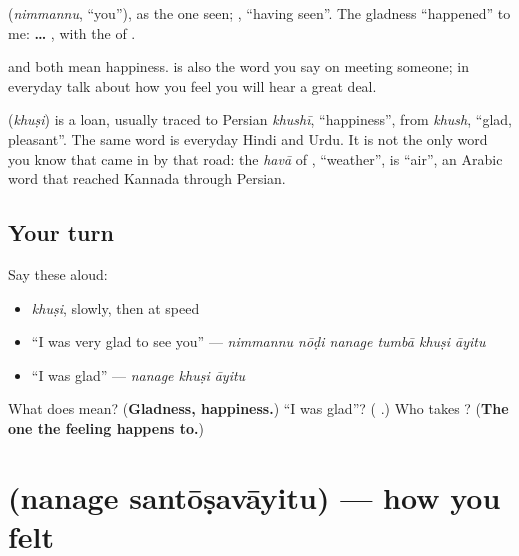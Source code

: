 \textbf{} (\emph{nimmannu}, \textquotedblleft{}you\textquotedblright{}), as the one seen; \textbf{}, \textquotedblleft{}having seen\textquotedblright{}. The gladness \textquotedblleft{}happened\textquotedblright{} to me: \textbf{ …  }, with the \textbf{} of \textbf{  }.

\textbf{} and \textbf{} both mean happiness. \textbf{} is also the word you say on meeting someone; in everyday talk about how you feel you will hear \textbf{} a great deal.

\begin{cousinweb}
\textbf{} (\emph{khuṣi}) is a loan, usually traced to Persian \emph{khushī}, \textquotedblleft{}happiness\textquotedblright{}, from \emph{khush}, \textquotedblleft{}glad, pleasant\textquotedblright{}. The same word is everyday Hindi and Urdu. It is not the only word you know that came in by that road: the \emph{havā} of \textbf{}, \textquotedblleft{}weather\textquotedblright{}, is \textquotedblleft{}air\textquotedblright{}, an Arabic word that reached Kannada through Persian.
\end{cousinweb}

\subsection*{Your turn}
Say these aloud:

\begin{itemize}
\raggedright
  \item \emph{khuṣi}, slowly, then at speed
  \item \textquotedblleft{}I was very glad to see you\textquotedblright{} — \emph{nimmannu nōḍi nanage tumbā khuṣi āyitu}
  \item \textquotedblleft{}I was glad\textquotedblright{} — \emph{nanage khuṣi āyitu}
\end{itemize}

\begin{tcolorbox}[breakable,colback=teal!4,colframe=teal!35!black,title={Before you move on}]
What does \textbf{} mean? (\textbf{Gladness, happiness.}) \textquotedblleft{}I was glad\textquotedblright{}? (\textbf{  }.) Who takes \textbf{}? (\textbf{The one the feeling happens to.})
\end{tcolorbox}
\section[\texorpdfstring{\kn{ನನಗೆ} \kn{ಸಂತೋಷವಾಯಿತು} (nanage santōṣavāyitu)}{ನನಗೆ ಸಂತೋಷವಾಯಿತು (nanage santōṣavāyitu)}]{  (nanage santōṣavāyitu) — how you felt}

